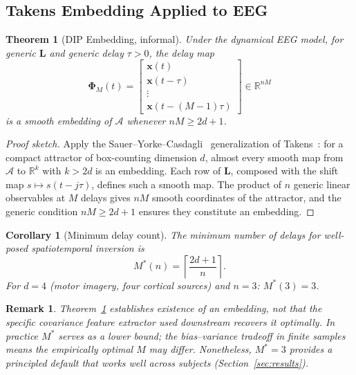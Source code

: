 \documentclass[journal]{IEEEtran}
\newtheorem{theorem}{Theorem}
\newtheorem{corollary}{Corollary}
\newtheorem{remark}{Remark}
\newcommand{\R}{\mathbb{R}}
\newcommand{\bx}{\mathbf{x}}
\newcommand{\bL}{\mathbf{L}}
\newcommand{\bPhi}{\boldsymbol{\Phi}}
\newcommand{\calA}{\mathcal{A}}
\begin{document}
\subsection{Takens Embedding Applied to EEG}

\begin{theorem}[DIP Embedding, informal]
\label{thm:dip}
Under the dynamical EEG model, for generic $\bL$ and generic delay $\tau > 0$, the delay map
\begin{equation}
\bPhi_M(t) = \begin{bmatrix}\bx(t)\\ \bx(t-\tau)\\ \vdots\\ \bx(t-(M-1)\tau)\end{bmatrix} \in \R^{nM}
\label{eq:embed}
\end{equation}
is a smooth embedding of $\calA$ whenever $nM \geq 2d+1$.
\end{theorem}

\begin{proof}[Proof sketch]
Apply the Sauer--Yorke--Casdagli~\cite{sauer1991} generalization of Takens~\cite{takens1981}: for a compact attractor of box-counting dimension $d$, almost every smooth map from $\calA$ to $\R^k$ with $k > 2d$ is an embedding. Each row of $\bL$, composed with the shift map $s \mapsto s(t-j\tau)$, defines such a smooth map. The product of $n$ generic linear observables at $M$ delays gives $nM$ smooth coordinates of the attractor, and the generic condition $nM \geq 2d+1$ ensures they constitute an embedding.
\end{proof}

\begin{corollary}[Minimum delay count]
\label{cor:mstar}
The minimum number of delays for well-posed spatiotemporal inversion is
\begin{equation}
M^*(n) = \left\lceil \frac{2d+1}{n} \right\rceil.
\label{eq:mstar}
\end{equation}
For $d = 4$ (motor imagery, four cortical sources) and $n = 3$: $M^*(3) = 3$.
\end{corollary}

\begin{remark}
Theorem~\ref{thm:dip} establishes existence of an embedding, not that the specific covariance feature extractor used downstream recovers it optimally. In practice $M^*$ serves as a lower bound; the bias--variance tradeoff in finite samples means the empirically optimal $M$ may differ. Nonetheless, $M^* = 3$ provides a principled default that works well across subjects (Section~\ref{sec:results}).
\end{remark}
\end{document}
